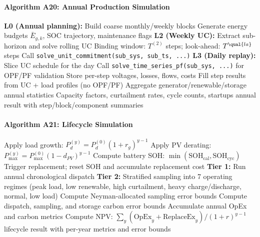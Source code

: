 \paragraph{Algorithm A20: Annual Production Simulation}
\begin{algorithmic}[1]
  \State \textbf{L0 (Annual planning):} Build coarse monthly/weekly blocks
  \Statex \quad Generate energy budgets $\bar E_{g,k}$, SOC trajectory, maintenance flags
    \State \textbf{L2 (Weekly UC):} Extract sub-horizon and solve rolling UC
    \Statex \quad Binding window: $T^{(2)}$ steps; look-ahead: $T^{\qual{la}}$ steps
    \Statex \quad Call \texttt{solve\_unit\_commitment(sub\_sys, sub\_ts, ...)}
        \State \textbf{L3 (Daily replay):} Slice UC schedule for the day
        \State Call \texttt{solve\_time\_series\_pf(sub\_sys, ...)} for OPF/PF validation
        \State Store per-step voltages, losses, flows, costs
      \EndFor
    \Else
      \State Fill step results from UC + load profiles (no OPF/PF)
    \EndIf
  \EndFor
  \State Aggregate generator/renewable/storage annual statistics
  \Statex \quad Capacity factors, curtailment rates, cycle counts, startups
  \State \Return annual result with step/block/component summaries
\EndProcedure
\end{algorithmic}

\paragraph{Algorithm A21: Lifecycle Simulation}
\begin{algorithmic}[1]
    \State Apply load growth: $P_d^{(y)} = P_d^{(0)} (1 + r_g)^{y-1}$
    \State Apply PV derating: $P_{\max}^{(y)} = P_{\max}^{(0)} (1 - d_{PV})^{y-1}$
    \State Compute battery SOH: $\min(\text{SOH}_{\text{cal}}, \text{SOH}_{\text{cyc}})$
      \State Trigger replacement; reset SOH and accumulate replacement cost
    \EndIf
    \State \textbf{Tier 1:} Run annual chronological dispatch
    \State \textbf{Tier 2:} Stratified sampling into 7 operating regimes
    \Statex \quad (peak load, low renewable, high curtailment, heavy charge/discharge, normal, low load)
    \State Compute Neyman-allocated sampling error bounds
    \State Compute dispatch, sampling, and storage carbon error bounds
    \State Accumulate annual OpEx and carbon metrics
  \EndFor
  \State Compute NPV: $\sum_{y} (\text{OpEx}_y + \text{ReplaceEx}_y) / (1+r)^{y-1}$
  \State \Return lifecycle result with per-year metrics and error bounds
\EndProcedure
\end{algorithmic}
